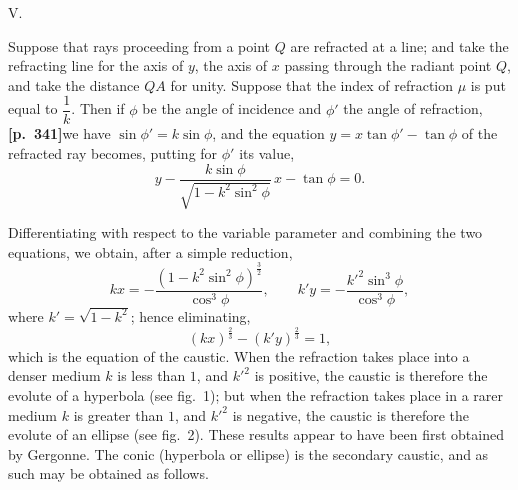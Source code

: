 \documentclass[11pt]{article}
\begin{document}
\medskip
\begin{center}V.\end{center}

Suppose that rays proceeding from a point $Q$ are refracted at a line; and take the refracting line for the axis of $y$, the axis of $x$ passing through the radiant point $Q$, and take the distance $QA$ for unity. Suppose that the index of refraction $\mu$ is put equal to $\dfrac{1}{k}$. Then if $\phi$ be the angle of incidence and $\phi'$ the angle of refraction, \textbf{[p.~341]}\quad we have $\sin\phi' = k\sin\phi$, and the equation $y = x\tan\phi' - \tan\phi$ of the refracted ray becomes, putting for $\phi'$ its value,
\[
y - \frac{k\sin\phi}{\sqrt{1-k^{2}\sin^{2}\phi}}\,x - \tan\phi = 0.
\]

\begin{center}
\end{center}

\smallskip

Differentiating with respect to the variable parameter and combining the two equations, we obtain, after a simple reduction,
\[
kx = -\frac{(1-k^{2}\sin^{2}\phi)^{\tfrac{3}{2}}}{\cos^{3}\phi},\qquad k'y = -\frac{k'^{2}\sin^{3}\phi}{\cos^{3}\phi},
\]
where $k' = \sqrt{1-k^{2}}$; hence eliminating,
\[
(kx)^{\tfrac{2}{3}} - (k'y)^{\tfrac{2}{3}} = 1,
\]
which is the equation of the caustic. When the refraction takes place into a denser medium $k$ is less than $1$, and $k'^{2}$ is positive, the caustic is therefore the evolute of a hyperbola (see fig.~1); but when the refraction takes place in a rarer medium $k$ is greater than $1$, and $k'^{2}$ is negative, the caustic is therefore the evolute of an ellipse (see fig.~2). These results appear to have been first obtained by Gergonne. The conic (hyperbola or ellipse) is the secondary caustic, and as such may be obtained as follows.
\end{document}
